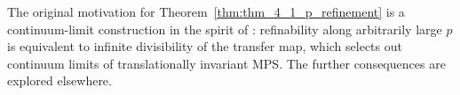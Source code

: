 \begin{remark}\notready
    \label{rem:thm_4_1_continuum_limit}
    The original motivation for Theorem~\ref{thm:thm_4_1_p_refinement}
    is a continuum-limit construction in the spirit of
    \cite{DeLasCuevas2017Irreducible}: refinability along arbitrarily
    large $p$ is equivalent to infinite divisibility of the transfer
    map, which selects out continuum limits of translationally invariant
    MPS.  The further consequences are explored elsewhere.
\end{remark}
